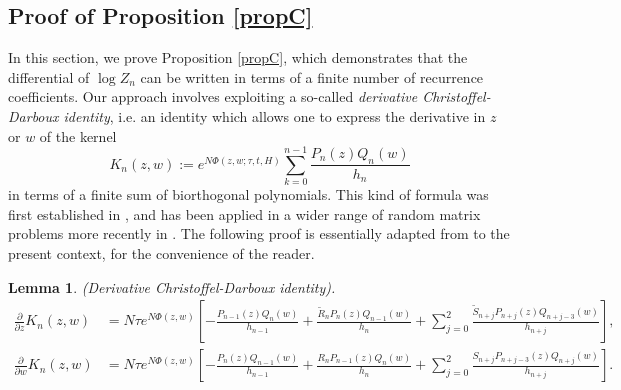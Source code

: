 \documentclass[usenames,dvipsnames]{article}
\theoremstyle{definition}
\newtheorem{lemma}{Lemma}[section]
\numberwithin{equation}{section}
\numberwithin{figure}{section}
\begin{document}
\subsection{Proof of Proposition \ref{propC}}\label{propC-proof}
In this section, we prove Proposition \ref{propC}, which demonstrates that the differential of $\log Z_n$ can be written in terms of a finite number of recurrence coefficients. Our approach involves exploiting a so-called \textit{derivative Christoffel-Darboux identity}, i.e. an identity which allows one to express the derivative in $z$ or $w$ of the kernel
    \begin{equation}
        K_n(z,w) := e^{N\Phi(z,w;\tau,t,H)}\sum_{k=0}^{n-1}\frac{P_n(z)Q_n(w)}{h_n}
    \end{equation}
in terms of a finite sum of biorthogonal polynomials. This kind of formula was first established in \cite{BEH}, and has been applied in a wider range of random matrix problems more recently in \cite{ABK,BLY}. The following proof is essentially adapted from \cite{BLY} to the present context, for the convenience of the reader.
\begin{lemma}\label{CD-lemma} \textit{(Derivative Christoffel-Darboux identity).}
    \begin{align*}
        \frac{\partial}{\partial z} K_n(z,w) &= N\tau e^{N\Phi(z,w)}\left[-\frac{P_{n-1}(z)Q_n(w)}{h_{n-1}} + \frac{\tilde{R}_nP_n(z)Q_{n-1}(w)}{h_n} + \sum_{j=0}^{2}\frac{\tilde{S}_{n+j}P_{n+j}(z)Q_{n+j-3}(w)}{h_{n+j}} \right],\\
        \frac{\partial}{\partial w} K_n(z,w) &=N\tau e^{N\Phi(z,w)}\left[-\frac{P_n(z)Q_{n-1}(w)}{h_{n-1}} + \frac{R_nP_{n-1}(z)Q_n(w)}{h_n} + \sum_{j=0}^{2}\frac{S_{n+j}P_{n+j-3}(z)Q_{n+j}(w)}{h_{n+j}} \right].
    \end{align*}
\end{lemma}
\end{document}
